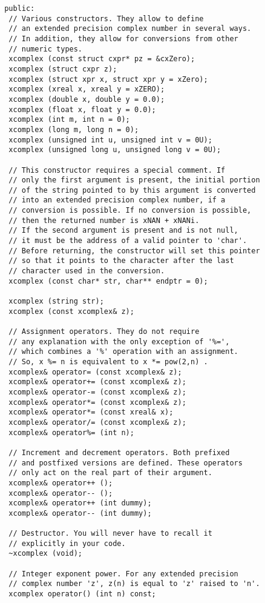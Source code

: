 \documentclass{article}
\begin{document}
\begin{verbatim}
 public:
  // Various constructors. They allow to define
  // an extended precision complex number in several ways.
  // In addition, they allow for conversions from other
  // numeric types.
  xcomplex (const struct cxpr* pz = &cxZero);
  xcomplex (struct cxpr z);
  xcomplex (struct xpr x, struct xpr y = xZero);
  xcomplex (xreal x, xreal y = xZERO);
  xcomplex (double x, double y = 0.0);
  xcomplex (float x, float y = 0.0);
  xcomplex (int m, int n = 0);
  xcomplex (long m, long n = 0);
  xcomplex (unsigned int u, unsigned int v = 0U);
  xcomplex (unsigned long u, unsigned long v = 0U);
  
  // This constructor requires a special comment. If
  // only the first argument is present, the initial portion
  // of the string pointed to by this argument is converted
  // into an extended precision complex number, if a 
  // conversion is possible. If no conversion is possible,
  // then the returned number is xNAN + xNANi. 
  // If the second argument is present and is not null,
  // it must be the address of a valid pointer to 'char'.
  // Before returning, the constructor will set this pointer
  // so that it points to the character after the last 
  // character used in the conversion.
  xcomplex (const char* str, char** endptr = 0);

  xcomplex (string str);
  xcomplex (const xcomplex& z);

  // Assignment operators. They do not require
  // any explanation with the only exception of '%=',
  // which combines a '%' operation with an assignment.
  // So, x %= n is equivalent to x *= pow(2,n) .
  xcomplex& operator= (const xcomplex& z);
  xcomplex& operator+= (const xcomplex& z);
  xcomplex& operator-= (const xcomplex& z);
  xcomplex& operator*= (const xcomplex& z);
  xcomplex& operator*= (const xreal& x);
  xcomplex& operator/= (const xcomplex& z);
  xcomplex& operator%= (int n);

  // Increment and decrement operators. Both prefixed
  // and postfixed versions are defined. These operators
  // only act on the real part of their argument.
  xcomplex& operator++ ();
  xcomplex& operator-- ();
  xcomplex& operator++ (int dummy);
  xcomplex& operator-- (int dummy);

  // Destructor. You will never have to recall it
  // explicitly in your code.
  ~xcomplex (void);

  // Integer exponent power. For any extended precision
  // complex number 'z', z(n) is equal to 'z' raised to 'n'.
  xcomplex operator() (int n) const;


\end{verbatim}
\end{document}
